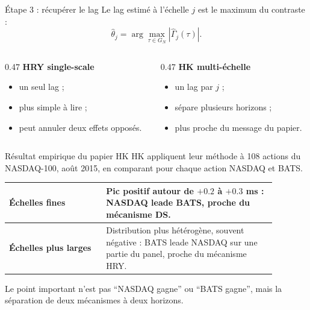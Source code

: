 \documentclass[10pt,aspectratio=169]{beamer}
\newcommand{\thetahat}{\hat{\theta}}
\newcommand{\Gammahat}{\hat{\Gamma}}
\begin{document}
\begin{frame}{Étape 3 : récupérer le lag}
  Le lag estimé à l'échelle \(j\) est le maximum du contraste :
  \[
    \thetahat_j
    =
    \arg\max_{\tau \in G_N}
    |\Gammahat_j(\tau)|.
  \]

  \vspace{0.25cm}
  \begin{columns}[T]
    \begin{column}{0.47\linewidth}
      \textbf{HRY single-scale}
      \begin{itemize}
        \item un seul lag ;
        \item plus simple à lire ;
        \item peut annuler deux effets opposés.
      \end{itemize}
    \end{column}
    \begin{column}{0.47\linewidth}
      \textbf{HK multi-échelle}
      \begin{itemize}
        \item un lag par \(j\) ;
        \item sépare plusieurs horizons ;
        \item plus proche du message du papier.
      \end{itemize}
    \end{column}
  \end{columns}
\end{frame}

\begin{frame}{Résultat empirique du papier HK}
  \small
  HK appliquent leur méthode à 108 actions du NASDAQ-100, août 2015, en comparant pour chaque action NASDAQ et BATS.

  \vspace{0.25cm}
  \begin{tabular}{p{0.32\linewidth}p{0.56\linewidth}}
    \toprule
    \textbf{Échelles fines} & Pic positif autour de \(+0.2\) à \(+0.3\) ms : NASDAQ leade BATS, proche du mécanisme DS. \\
    \midrule
    \textbf{Échelles plus larges} & Distribution plus hétérogène, souvent négative : BATS leade NASDAQ sur une partie du panel, proche du mécanisme HRY. \\
    \bottomrule
  \end{tabular}

  \vspace{0.35cm}
  \normalsize
  Le point important n'est pas ``NASDAQ gagne'' ou ``BATS gagne'', mais la séparation de deux mécanismes à deux horizons.
\end{frame}
\end{document}
